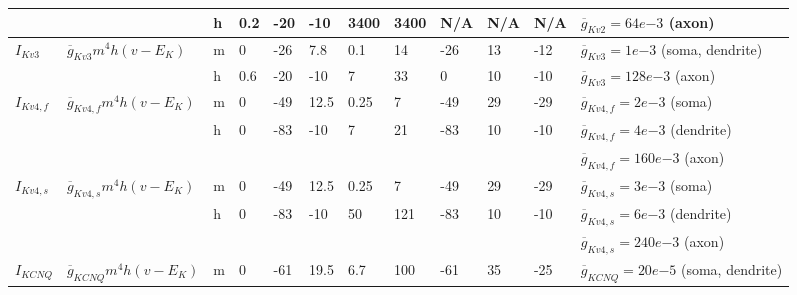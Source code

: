 \begin{table}[ht]
\begin{adjustbox}{width=\textwidth}
\begin{tabular}{llllllllllll}
                      &                                                    & h    & 0.2     & -20  & -10                   & 3400       & 3400       & N/A                 & N/A             & N/A             & $ \overline{g}_{Kv2} = 64 e{-3} $ (axon) \\ \midrule
%
$ I_{Kv3} $            & $ \overline{g}_{Kv3} m^4 h (v - E_{K}) $           & m    & 0       & -26                   & 7.8                   & 0.1        & 14         & -26                 & 13              & -12             & $ \overline{g}_{Kv3} = 1 e{-3} $ (soma, dendrite)  \\
                      &                                                    & h    & 0.6     & -20                   & -10                   & 7          & 33         & 0                   & 10              & -10             & $ \overline{g}_{Kv3} = 128 e{-3} $ (axon) \\ \midrule
%
$ I_{Kv4,f} $          & $ \overline{g}_{Kv4,f} m^4 h (v - E_{K}) $         & m    & 0       & -49                   & 12.5                  & 0.25       & 7          & -49                 & 29              & -29             & $ \overline{g}_{Kv4,f} = 2 e{-3} $ (soma) \\
                      &                                                    & h    & 0       & -83                   & -10                   & 7          & 21         & -83                 & 10              & -10             & $ \overline{g}_{Kv4,f} = 4 e{-3} $ (dendrite) \\
 & & & & & & & & & & & $ \overline{g}_{Kv4,f} = 160 e{-3} $ (axon)  \\ \midrule
%
$ I_{Kv4,s} $          & $ \overline{g}_{Kv4,s} m^4 h (v - E_{K}) $         & m    & 0       & -49                   & 12.5                  & 0.25       & 7          & -49                 & 29              & -29             & $ \overline{g}_{Kv4,s} = 3 e{-3} $ (soma)  \\
                      &                                                    & h    & 0       & -83                   & -10                   & 50         & 121        & -83                 & 10              & -10             & $ \overline{g}_{Kv4,s} = 6 e{-3} $ (dendrite) \\
 & & & & & & & & & & & $ \overline{g}_{Kv4,s} = 240 e{-3} $ (axon) \\ \midrule
%
$ I_{KCNQ} $  & $ \overline{g}_{KCNQ} m^4 h (v - E_{K}) $ & m    & 0       & -61                   & 19.5                  & 6.7        & 100        & -61                 & 35              & -25             & $ \overline{g}_{KCNQ} = 20 e{-5} $ (soma, dendrite)  \\

\end{tabular}
\end{adjustbox}
\end{table}

